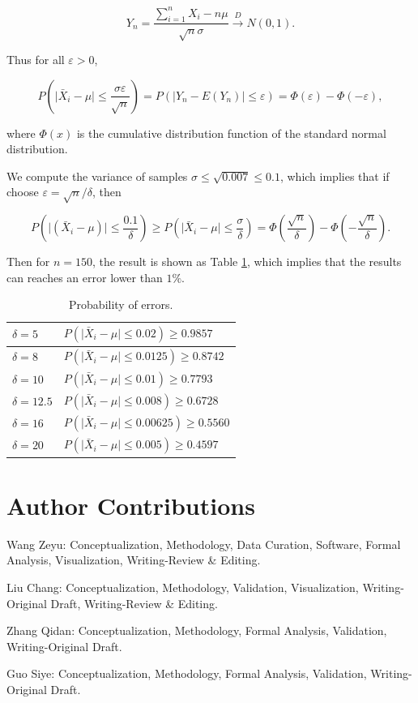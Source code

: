 \documentclass[11pt]{article}
\begin{document}
$$
    Y_n = \frac{\sum_{i=1}^n X_i - n \mu}{\sqrt{n} \sigma} \xrightarrow{D} N(0, 1).
$$

Thus for all $\varepsilon > 0$,

$$
    P\left(\vert \bar{X}_i - \mu \vert \leq \frac{\sigma \varepsilon}{\sqrt{n}}\right) = P(\vert Y_n - E(Y_n) \vert \leq \varepsilon) = \varPhi(\varepsilon) - \varPhi(-\varepsilon),
$$

where $\varPhi(x)$ is the cumulative distribution function of the standard normal distribution.

We compute the variance of samples $\sigma \leq \sqrt{0.007} \leq 0.1$, which implies that if choose $\varepsilon = \sqrt{n} / \delta$, then

$$
    P\left(\vert (\bar{X}_i - \mu)\vert \leq \frac{0.1}{\delta}\right) \geq P\left(\vert \bar{X}_i - \mu \vert \leq \frac{\sigma}{\delta}\right) = \varPhi\left(\frac{\sqrt{n}}{\delta}\right) - \varPhi\left(-\frac{\sqrt{n}}{\delta}\right).
$$

Then for $n = 150$, the result is shown as Table \ref{table-a-as-repetitions}, which implies that the results can reaches an error lower than $1\%$.

\begin{table}[H]
    \centering
    \begin{tabular}{|l|l|}
        \hline
        $\delta = 5$    & $P(\vert \bar{X}_i - \mu \vert \leq 0.02) \geq 0.9857$    \\
        \hline
        $\delta = 8$    & $P(\vert \bar{X}_i - \mu \vert \leq 0.0125) \geq 0.8742$  \\
        \hline
        $\delta = 10$   & $P(\vert \bar{X}_i - \mu \vert \leq 0.01) \geq 0.7793$    \\
        \hline
        $\delta = 12.5$ & $P(\vert \bar{X}_i - \mu \vert \leq 0.008) \geq 0.6728$   \\
        \hline
        $\delta = 16$   & $P(\vert \bar{X}_i - \mu \vert \leq 0.00625) \geq 0.5560$ \\
        \hline
        $\delta = 20$   & $P(\vert \bar{X}_i - \mu \vert \leq 0.005) \geq 0.4597$   \\
        \hline
    \end{tabular}
    \caption{Probability of errors.}
    \label{table-a-as-repetitions}
\end{table}

\section{Author Contributions}

Wang Zeyu: Conceptualization, Methodology, Data Curation, Software, Formal Analysis, Visualization, Writing-Review \& Editing.

Liu Chang: Conceptualization, Methodology, Validation, Visualization, Writing-Original Draft, Writing-Review \& Editing.

Zhang Qidan: Conceptualization, Methodology, Formal Analysis, Validation, Writing-Original Draft.

Guo Siye: Conceptualization, Methodology, Formal Analysis, Validation, Writing-Original Draft.
\end{document}

